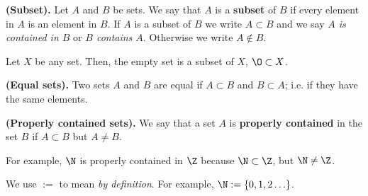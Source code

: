 

\begin{definition}
    \textbf{(Subset).} Let $A$ and $B$ be sets. We say that $A$ is a \textbf{subset} of $B$ if every element in $A$ is an element in $B$. If $A$ is a subset of $B$ we write $A\subset B$ and we say \textit{$A$ is contained in $B$} or \textit{$B$ contains $A$}. Otherwise we write $A\notin B$.
\end{definition}
\begin{remark}
    Let $X$ be any set. Then, the empty set is a subset of $X$, $\O\subset X$.
\end{remark}


\begin{definition}
    \textbf{(Equal sets).} Two sets $A$ and $B$ are equal if $A \subset B$ and $B\subset A$; i.e. if they have the same elements.
\end{definition}
\begin{definition}
    \textbf{(Properly contained sets).} We say that a set $A$ is \textbf{properly contained} in the set $B$ if $A\subset B$ but $A\neq B$.
\end{definition}

For example, $\N$ is properly contained in $\Z$ because $\N\subset\Z$, but $\N\neq\Z$.
\begin{notation}
    We use $:=$ to mean \textit{by definition}. For example, $\N := \{0, 1, 2\ldots\} $.
\end{notation}

